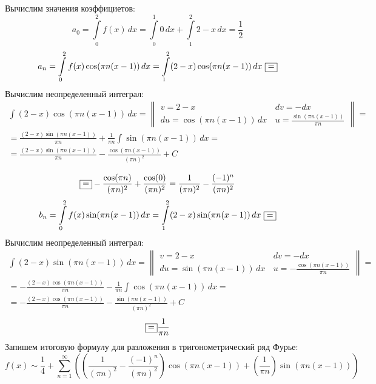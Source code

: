 \documentclass[a5paper, 10pt]{article}
\theoremstyle{definition}
\theoremstyle{plain}
\theoremstyle{remark}
\begin{document}
Вычислим значения коэффициетов:
\begin{equation*}
a_0 = \int \limits_{0}^{2} f(x) \, dx = \int \limits_{0}^{1} 0 \, dx + \int \limits_{1}^{2} 2 - x \, dx = \frac{1}{2}
\end{equation*}
\begin{multline*}
a_n  = \int \limits_{0}^{2} f(x) \cos(\pi n(x-1)) \, dx = \int \limits_{1}^{2} (2-x) \cos(\pi n(x-1)) \, dx \, \, \fbox{=}
\end{multline*}
Вычислим неопределенный интеграл:
\begin{multline*}
 \int  (2-x) \cos(\pi n(x-1)) \, dx = 
\begin{Vmatrix}
v = 2-x \, & dv = -dx\\
du = \cos(\pi n(x-1)) \, dx \, & u = \frac{\sin(\pi n(x-1))}{\pi n}
\end{Vmatrix}
= \\ =  \frac{(2-x) \sin(\pi n(x-1))}{\pi n} + \frac{1}{\pi n} \int \sin(\pi n(x-1)) \, dx = \\=
 \frac{(2-x) \sin(\pi n(x-1))}{\pi n} -  \frac{\cos (\pi n(x-1))}{(\pi n)^2} + C
\end{multline*}

\begin{equation*}
\fbox{=} -  \frac{\cos (\pi n)}{(\pi n)^2} + \frac{\cos (0)}{(\pi n)^2} = \frac{1}{(\pi n)^2} -  \frac{(-1)^n}{(\pi n)^2}
\end{equation*}
\begin{equation*}
b_n  = \int \limits_{0}^{2} f(x) \sin(\pi n(x-1)) \, dx  =  \int \limits_{1}^{2} (2-x) \sin(\pi n(x-1)) \, dx \, \, \fbox{=}
\end{equation*}
Вычислим неопределенный интеграл:
\begin{multline*}
 \int  (2-x) \sin(\pi n(x-1)) \, dx = 
\begin{Vmatrix}
v = 2-x \, & dv = -dx\\
du = \sin(\pi n(x-1)) \, dx \, & u = -\frac{\cos(\pi n(x-1))}{\pi n}
\end{Vmatrix}
= \\ =  - \frac{(2-x) \cos(\pi n(x-1))}{\pi n} - \frac{1}{\pi n} \int \cos(\pi n(x-1)) \, dx = \\=
 -\frac{(2-x) \cos(\pi n(x-1))}{\pi n} -  \frac{\sin (\pi n(x-1))}{(\pi n)^2} + C
\end{multline*}
\begin{equation*}
\fbox{=} \frac{1}{\pi n}
\end{equation*}
Запишем итоговую формулу для разложения в тригонометрический ряд Фурье:
\begin{equation*}
f (x) \sim  \frac{1}{4} + \sum \limits_{n = 1}^{\infty} \left( \left( \frac{1}{(\pi n)^2} -  \frac{(-1)^n}{(\pi n)^2}  \right) \cos(\pi n(x-1)) +  \left( \frac{1}{\pi n} \right) \sin(\pi n(x-1)) \right)
\end{equation*}
\end{document}
